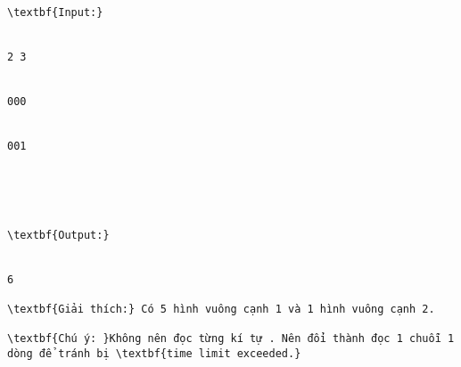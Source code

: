 \begin{verbatim}
\textbf{Input:}


2 3


000


001





\textbf{Output:}


6

\textbf{Giải thích:} Có 5 hình vuông cạnh 1 và 1 hình vuông cạnh 2.

\textbf{Chú ý: }Không nên đọc từng kí tự . Nên đổi thành đọc 1 chuỗi 1 dòng để tránh bị \textbf{time limit exceeded.}\end{verbatim}